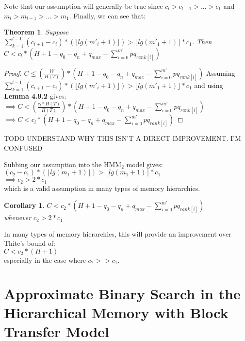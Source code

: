 \documentclass[letterpaper,12pt,titlepage,oneside,final]{book}
\theoremstyle{plain}
\newtheorem{thm}{Theorem}[section]
\newtheorem*{cor}{Corollary}
\begin{document}
Note that our assumption will generally be true since $c_l > c_{l-1} > ... > c_1$ and $m_l > m_{l-1} > ... > m_1$. Finally, we can see that: \\

\begin{thm}
Suppose $\sum_{k=1}^{l-1} (c_{i+1}-c_i)*(\lfloor lg(m'_i+1) \rfloor) > \lfloor lg(m'_1+1) \rfloor*c_1$. Then \\
$C <  c_l * (H + 1 - q_0 - q_n + q_{max} - \sum_{i=0}^{m'} pq_{rank[i]})$
\end{thm}

\begin{proof}
$C \leq  (\frac{W}{H(T)}) * (H + 1 - q_0 - q_n + q_{max} - \sum_{i=0}^{m'} pq_{rank[i]})$
Assuming $\sum_{k=1}^{l-1} (c_{i+1}-c_i)*(\lfloor lg(m'_i+1) \rfloor) > \lfloor lg(m'_1+1) \rfloor*c_1$ and using \textbf{Lemma 4.9.2} gives: \\
$\implies C <  (\frac{c_l*H(T)}{H(T)}) * (H + 1 - q_0 - q_n + q_{max} - \sum_{i=0}^{m'} pq_{rank[i]})$ \\
$\implies C <  c_l * (H + 1 - q_0 - q_n + q_{max} - \sum_{i=0}^{m'} pq_{rank[i]})$
\end{proof}

TODO UNDERSTAND WHY THIS ISN'T A DIRECT IMPROVEMENT. I'M CONFUSED

Subbing our assumption into the HMM$_2$ model gives:
$(c_2-c_1)*(\lfloor lg(m_1+1) \rfloor) > \lfloor lg(m_1+1) \rfloor*c_1$ \\
$\implies c_2 > 2*c_1$ \\
which is a valid assumption in many types of memory hierarchies.

\begin{cor}
$C <  c_2 * (H + 1 - q_0 - q_n + q_{max} - \sum_{i=0}^{m'} pq_{rank[i]})$ \\ whenever $c_2 > 2*c_1$
\end{cor}

In many types of memory hierarchies, this will provide an improvement over Thite's bound of: \\
$C < c_2 * (H+1)$ \\
especially in the case where $c_2 >> c_1$.




\chapter{Approximate Binary Search in the Hierarchical Memory with Block Transfer Model}
\end{document}
